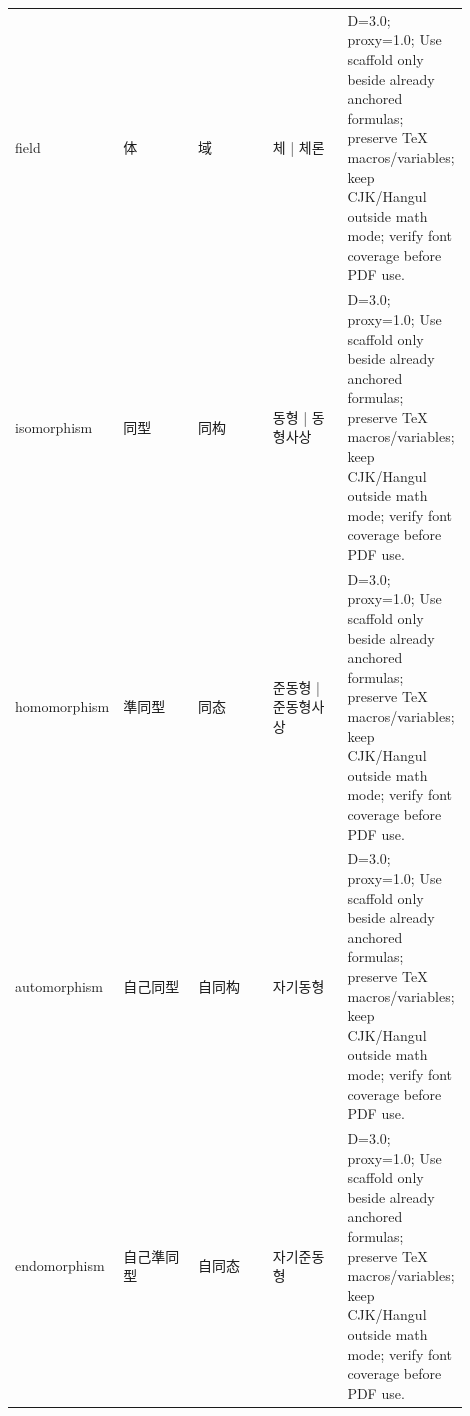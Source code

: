 \documentclass{article}
\begin{document}
\begin{longtable}{p{0.17\linewidth}p{0.18\linewidth}p{0.18\linewidth}p{0.18\linewidth}p{0.19\linewidth}}
field & 体 & 域 & 체 | 체론 & D=3.0; proxy=1.0; Use scaffold only beside already anchored formulas; preserve TeX macros/variables; keep CJK/Hangul outside math mode; verify font coverage before PDF use.\\
isomorphism & 同型 & 同构 & 동형 | 동형사상 & D=3.0; proxy=1.0; Use scaffold only beside already anchored formulas; preserve TeX macros/variables; keep CJK/Hangul outside math mode; verify font coverage before PDF use.\\
homomorphism & 準同型 & 同态 & 준동형 | 준동형사상 & D=3.0; proxy=1.0; Use scaffold only beside already anchored formulas; preserve TeX macros/variables; keep CJK/Hangul outside math mode; verify font coverage before PDF use.\\
automorphism & 自己同型 & 自同构 & 자기동형 & D=3.0; proxy=1.0; Use scaffold only beside already anchored formulas; preserve TeX macros/variables; keep CJK/Hangul outside math mode; verify font coverage before PDF use.\\
endomorphism & 自己準同型 & 自同态 & 자기준동형 & D=3.0; proxy=1.0; Use scaffold only beside already anchored formulas; preserve TeX macros/variables; keep CJK/Hangul outside math mode; verify font coverage before PDF use.\\
\end{longtable}
\end{document}
